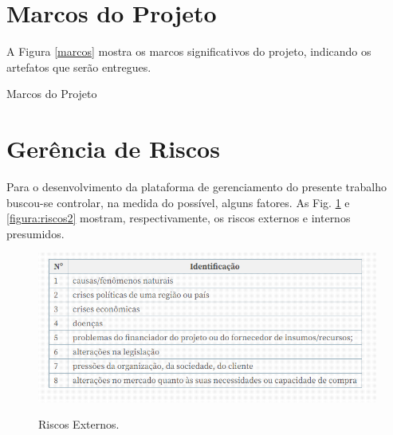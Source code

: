 \section{Marcos do Projeto}

A Figura \ref{marcos}  mostra os marcos significativos do
projeto, indicando os artefatos que serão entregues.

\begin{table}[h]
	\centering
	\caption{Marcos do Projeto}
	\label{marcos}
\hrulefill
\end{table}

\section{Gerência de Riscos}
Para o desenvolvimento da plataforma de gerenciamento do presente trabalho buscou-se controlar, na medida do possível, alguns fatores. 
As Fig. \ref{figura:riscos1} e \ref{figura:riscos2} mostram, respectivamente, os riscos externos e internos presumidos. 


\begin{figure}[h]
	\caption{Riscos Externos.}
	
	\centering %
	\includegraphics[scale=0.85]{Figs/riscos1.png} %
	\label{figura:riscos1}
\end{figure}

